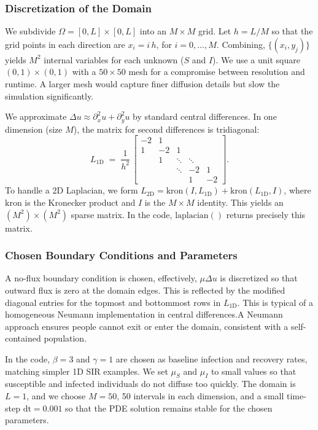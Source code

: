 \subsubsection{Discretization of the Domain}

We subdivide \(\Omega=[0,L]\times [0,L]\) into an \(\!M\times M\) grid. Let \(h=L/M\) so that the grid points in
each direction are \(x_i = i\,h\), for \(i=0,\dots,M\). Combining,
\(\bigl\{(x_i, y_j)\bigr\}\) yields \(M^2\) internal variables for each unknown (\(S\) and \(I\)). We use a unit 
square \((0,1)\times (0,1)\) with a \(50\times 50\) mesh for a compromise between resolution and runtime. A 
larger mesh would capture finer diffusion details but slow the simulation significantly.

We approximate \(\Delta u\approx \partial_x^2u+\partial_y^2u\) by standard central differences. In one dimension 
(size \(M\)), the matrix for second differences is tridiagonal:
\[
  L_{\text{1D}} \;=\; \frac{1}{h^2}\,\begin{bmatrix}
    -2 & 1 &         &   &     \\
     1 & -2 & 1      &   &     \\
       & 1  & \ddots & \ddots &\\
       &    & \ddots & -2 & 1   \\
       &    &        & 1 & -2
  \end{bmatrix}.
\]
To handle a 2D Laplacian, we form \(L_{\text{2D}} = \text{kron}(I,L_{\text{1D}}) + \text{kron}(L_{\text{1D}},I)\), 
where \(\text{kron}\) is the Kronecker product and \(I\) is the \(M\times M\) identity. This yields an 
\((M^2)\times(M^2)\) sparse matrix. In the code, \(\mathrm{laplacian()}\) returns precisely this matrix.

\subsubsection{Chosen Boundary Conditions and Parameters}

A no-flux boundary condition is chosen, effectively, \(\mu \Delta u\) is discretized so that outward flux is zero 
at the domain edges. This is reflected by the modified diagonal entries for the topmost and bottommost rows 
in \(L_{\text{1D}}\). This is typical of a homogeneous Neumann implementation in central differences.A Neumann 
approach ensures people cannot exit or enter the domain, consistent with a self-contained population. 


In the code, \(\beta=3\) and \(\gamma=1\) are chosen as baseline infection and recovery rates, matching simpler 
1D SIR examples.  We set \(\mu_S\) and \(\mu_I\) to small values so that susceptible and infected individuals do 
not diffuse too quickly.  The domain is \(L=1\), and we choose \(M=50\), 50 intervals in each dimension, and a 
small time-step \(\text{dt} = 0.001\) so that the PDE solution remains stable for the chosen parameters.


